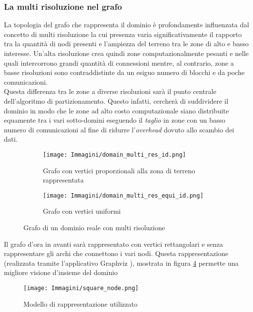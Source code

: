 \subsubsection{La multi risoluzione nel grafo}
La topologia del grafo che rappresenta il dominio è profondamente influenzata dal concetto di multi risoluzione la cui presenza varia significativamente il rapporto tra la quantità di nodi presenti e l'ampiezza del terreno tra le zone di alto e basso interesse. Un'alta risoluzione crea quindi zone computazionalmente pesanti e nelle quali intercorrono grandi quantità di connessioni mentre, al contrario, zone a basse risoluzioni sono contraddistinte da un esiguo numero di blocchi e da poche comunicazioni.\\
Questa differenza tra le zone a diverse risoluzioni sarà il punto centrale dell'algoritmo di partizionamento. Questo infatti, cercherà di suddividere il dominio in modo che le zone ad alto costo computazionale siano distribuite equamente tra i vari sotto-domini eseguendo il \textit{taglio} in zone con un basso numero di comunicazioni al fine di ridurre l'\textit{overhead} dovuto allo scambio dei dati.
\begin{figure}[H]
	\centering
	\begin{subfigure}{1.0\textwidth}
		\centering
		\texttt{[image: Immagini/domain\_multi\_res\_id.png]}
		\caption{Grafo con vertici proporzionali alla zona di terreno rappresentata\newline}
		\label{fig:graph_multi}
	\end{subfigure}
	\begin{subfigure}{1.0\textwidth}
		\centering
		\texttt{[image: Immagini/domain\_multi\_res\_equi\_id.png]}
		\caption{Grafo con vertici uniformi}
		\label{fig:graph_multi_equiv}
	\end{subfigure}
	\caption{Grafo di un dominio reale con multi risoluzione}
	\label{fig:domain_graph_multi}
\end{figure}

Il grafo d'ora in avanti sarà rappresentato con vertici rettangolari e senza rappresentare gli archi che connettono i vari nodi. Questa rappresentazione (realizzata tramite l'applicativo Graphviz \cite{graphviz}), mostrata in figura \ref{fig:square_graph} permette una migliore visione d'insieme del dominio
\begin{figure}[H]
	\centering
	\texttt{[image: Immagini/square\_node.png]}
	\caption{Modello di rappresentazione utilizzato}
	\label{fig:square_graph}
\end{figure}

